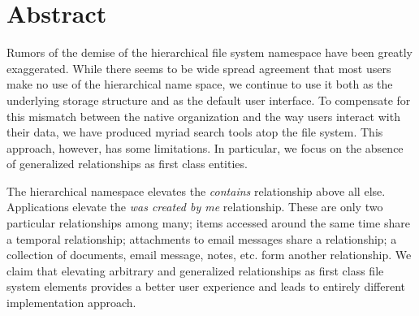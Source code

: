 \section*{Abstract}
Rumors of the demise of the hierarchical file system namespace have been
greatly exaggerated.
While there seems to be wide spread agreement that most users make no use
of the hierarchical name space, we continue to use it both as the underlying
storage structure and as the default user interface.
To compensate for this mismatch between the native organization and the
way users interact with their data,
we have produced myriad search tools atop the file system.
This approach, however, has some limitations.
In particular, we focus on the absence of generalized relationships
as first class entities.

The hierarchical namespace elevates the \emph{contains} relationship
above all else.
Applications elevate the \emph{was created by me} relationship.
These are only two particular relationships among many;
items accessed around the same time share a temporal relationship;
attachments to email messages share a relationship;
a collection of documents, email message, notes, etc. form another
relationship.
We claim that elevating arbitrary and generalized relationships as first class
file system elements provides a better user experience and leads to entirely
different implementation approach.

